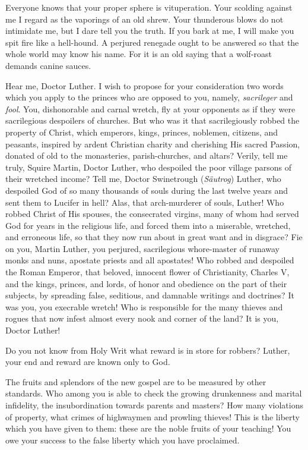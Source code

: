 Everyone knows that your proper sphere is vituperation. Your scolding
against me I regard as the vaporings of an old shrew. Your thunderous blows
do not intimidate me, but I dare tell you the truth. If you bark at me, I
will make you spit fire like a hell-hound. A perjured renegade ought to be
answered so that the whole world may know his name. For it is an old
saying that a wolf-roast demands canine sauces.

Hear me, Doctor Luther. I wish to propose for your consideration two
words which you apply to the princes who are opposed to you, namely, \textit{sacrileger}
and \textit{fool}. You, dishonorable and carnal wretch, fly at your opponents
as if they were sacrilegious despoilers of churches. But who was it that
sacrilegiously robbed the property of Christ, which emperors, kings, princes,
noblemen, citizens, and peasants, inspired by ardent Christian charity and
cherishing His sacred Passion, donated of old to the monasteries, parish-churches,
and altars? Verily, tell me truly, Squire Martin, Doctor Luther,
who despoiled the poor village parsons of their wretched income? Tell me,
Doctor Swinetrough (\textit{Säutrog}) Luther, who despoiled God of so many thousands
of souls during the last twelve years and sent them to Lucifer in hell?
Alas, that arch-murderer of souls, Luther! Who robbed Christ of His spouses,
the consecrated virgins, many of whom had served God for years in the
religious life, and forced them into a miserable, wretched, and erroneous life,
so that they now run about in great want and in disgrace? Fie on you,
Martin Luther, you perjured, sacrilegious whore-master of runaway monks
and nuns, apostate priests and all apostates! Who robbed and despoiled the
Roman Emperor, that beloved, innocent flower of Christianity, Charles V,
and the kings, princes, and lords, of honor and obedience on the part of their
subjects, by spreading false, seditious, and damnable writings and doctrines?
It was you, you execrable wretch! Who is responsible for the many thieves
and rogues that now infest almost every nook and corner of the land? It is
you, Doctor Luther!

Do you not know from Holy Writ what reward is in store for robbers?
Luther, your end and reward are known only to God.

The fruits and splendors of the new gospel are to be measured by other
standards. Who among you is able to check the growing drunkenness and
marital infidelity, the insubordination towards parents and masters? How
many violations of property, what crimes of highwaymen and prowling
thieves! This is the liberty which you have given to them: these are the
noble fruits of your teaching! You owe your success to the false liberty
which you have proclaimed.

